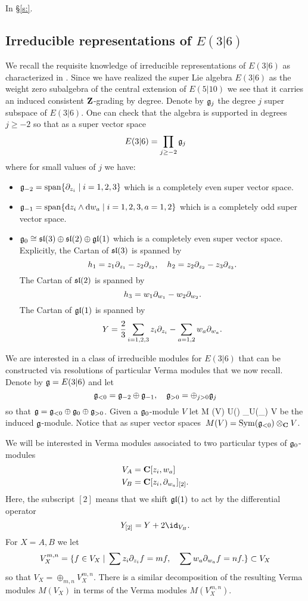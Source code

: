 \documentclass[11pt]{amsart}
\begin{document}

In \S \ref{s:}. 

\subsection{Irreducible representations of $E(3|6)$}
We recall the requisite knowledge of irreducible representations of $E(3|6)$ as characterized in \cite{KR1,KR2,KR3}.
Since we have realized the super Lie algebra $E(3|6)$ as the weight zero subalgebra of the central extension of $E(5|10)$ we see that it carries an induced consistent $\mathbf{Z}$-grading by degree. 
Denote by $\mathfrak g_j$ the degree $j$ super subspace of $E(3|6)$.
One can check that the algebra is supported in degrees $j \geq -2$ so that as a super vector space
\[
E(3|6) = \prod_{j \geq -2} \mathfrak g_j
\]
where for small values of $j$ we have:
\begin{itemize}
\item $\mathfrak g_{-2} = {\rm span}\{\partial_{z_i}\; | \; {i=1,2,3}\}$ which is a completely even super vector space. 
\item $\mathfrak g_{-1} = {\rm span}\{{\rm d} z_i \wedge {\rm d} w_a \; | \; i=1,2,3, a=1,2\}$ which is a completely odd super vector space.
\item $\mathfrak g_0 \cong \mathfrak{sl}(3) \oplus \mathfrak{sl}(2) \oplus \mathfrak{gl}(1)$ which is a completely even super vector space.
Explicitly, the Cartan of $\mathfrak{sl}(3)$ is spanned by 
\[
h_1 = z_1 \partial_{z_1} - z_2 \partial_{z_2}, \quad h_2 = z_2 \partial_{z_2} - z_3 \partial_{z_3} .
\]
The Cartan of $\mathfrak{sl}(2)$ is spanned by
\[
h_3 = w_1 \partial_{w_1} - w_2 \partial_{w_2} .
\]
The Cartan of $\mathfrak{gl}(1)$ is spanned by
\[
Y = \frac23 \sum_{i=1,2,3} z_i \partial_{z_i} - \sum_{a=1,2} w_a \partial_{w_a} .
\]
\end{itemize}

\parsec[s:vermas]

We are interested in a class of irreducible modules for $E(3|6)$ that can be constructed via resolutions of particular Verma modules \cite{KR2} that we now recall.
Denote by $\mathfrak g = E(3|6)$ and let 
\[
\mathfrak g_{<0} = \mathfrak g_{-2} \oplus \mathfrak g_{-1} , \quad \mathfrak{g}_{>0} = \oplus_{j>0} \mathfrak g_j 
\]
so that $\mathfrak g = \mathfrak g_{<0} \oplus \mathfrak g_0 \oplus \mathfrak g_{>0}$. 
Given a $\mathfrak g_0$-module $V$ let 
\beqn\label{eqn:verma1}
M (V)  U(\fg) \otimes_{U(\fg_{})} V 
\eeqn
be the induced $\mathfrak g$-module. 
Notice that as super vector spaces~$M(V) = \operatorname{Sym}(\mathfrak g_{<0}) \otimes_{\mathbf{C}} V$.

We will be interested in Verma modules associated to two particular types of $\mathfrak g_0$-modules
\begin{align*}
V_A & = \mathbf{C}[z_i, w_a] \\
V_B & = \mathbf{C}[z_i, \partial_{w_a}]_{[2]} .
\end{align*}
Here, the subscript $[2]$ means that we shift $\mathfrak{gl}(1)$ to act by the differential operator 
\[
Y_{[2]} = Y + 2 \id_{V_B} .
\]
For $X = A,B$ we let 
\[
V_X^{m,n} = \{f \in V_X \; | \; \sum z_i \partial_{z_i} f = m f , \quad \sum w_a \partial_{w_a} f = n f.\} \subset V_X
\]
so that $V_X = \oplus_{m,n} V_X^{m,n}$. 
There is a similar decomposition of the resulting Verma modules $M(V_X)$ in terms of the Verma modules $M(V_{X}^{m,n})$. 
\end{document}
